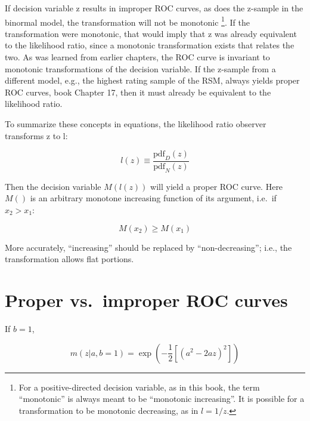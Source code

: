 \documentclass[
]{book}
\begin{document}
If decision variable z results in improper ROC curves, as does the z-sample in the binormal model, the transformation will not be monotonic \footnote{For a positive-directed decision variable, as in this book, the term ``monotonic'' is always meant to be ``monotonic increasing''. It is possible for a transformation to be monotonic decreasing, as in \(l = 1/z\).}. If the transformation were monotonic, that would imply that z was already equivalent to the likelihood ratio, since a monotonic transformation exists that relates the two. As was learned from earlier chapters, the ROC curve is invariant to monotonic transformations of the decision variable. If the z-sample from a different model, e.g., the highest rating sample of the RSM, always yields proper ROC curves, book Chapter 17, then it must already be equivalent to the likelihood ratio.

To summarize these concepts in equations, the likelihood ratio observer transforms z to l:

\begin{equation} 
l\left( z \right) \equiv  \frac{\text{pdf}_D\left( z \right)}{\text{pdf}_N\left( z \right)}
\label{eq:proper-roc-models-likelihood-ratio-definition}
\end{equation}

Then the decision variable \(M\left( l\left( z \right) \right)\) will yield a proper ROC curve. Here \(M\left( \right)\) is an arbitrary monotone increasing function of its argument, i.e.~if \(x_2 > x_1\):

\begin{equation} 
M\left( x_2 \right) \ge M\left( x_1 \right) 
\label{eq:proper-roc-models-definition-monotonic}
\end{equation}

More accurately, ``increasing'' should be replaced by ``non-decreasing''; i.e., the transformation allows flat portions.

\hypertarget{proper-roc-models-proper-vs-improper}{%
\section{Proper vs.~improper ROC curves}\label{proper-roc-models-proper-vs-improper}}

If \(b=1\),

\begin{equation} 
m\left( z|a,b=1 \right)=\exp\left( -\frac{1}{2} \left[ \left( a^2-2az \right)^2 \right]\right)
\label{eq:proper-roc-models-b-equal-1}
\end{equation}
\end{document}
